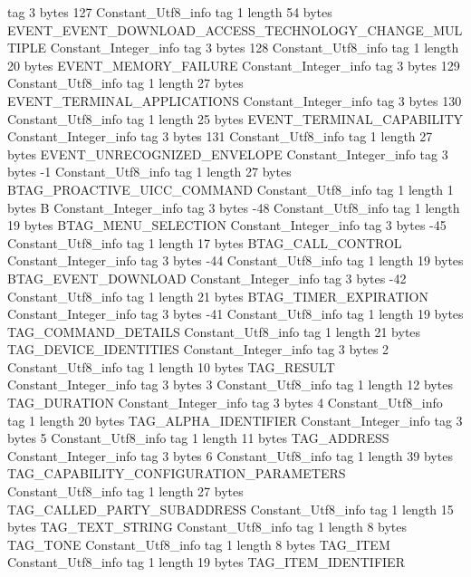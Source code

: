 {{{			tag	3
			bytes	127
		}
		Constant_Utf8_info {
			tag	1
			length	54
			bytes	EVENT_EVENT_DOWNLOAD_ACCESS_TECHNOLOGY_CHANGE_MULTIPLE
		}
		Constant_Integer_info {
			tag	3
			bytes	128
		}
		Constant_Utf8_info {
			tag	1
			length	20
			bytes	EVENT_MEMORY_FAILURE
		}
		Constant_Integer_info {
			tag	3
			bytes	129
		}
		Constant_Utf8_info {
			tag	1
			length	27
			bytes	EVENT_TERMINAL_APPLICATIONS
		}
		Constant_Integer_info {
			tag	3
			bytes	130
		}
		Constant_Utf8_info {
			tag	1
			length	25
			bytes	EVENT_TERMINAL_CAPABILITY
		}
		Constant_Integer_info {
			tag	3
			bytes	131
		}
		Constant_Utf8_info {
			tag	1
			length	27
			bytes	EVENT_UNRECOGNIZED_ENVELOPE
		}
		Constant_Integer_info {
			tag	3
			bytes	-1
		}
		Constant_Utf8_info {
			tag	1
			length	27
			bytes	BTAG_PROACTIVE_UICC_COMMAND
		}
		Constant_Utf8_info {
			tag	1
			length	1
			bytes	B
		}
		Constant_Integer_info {
			tag	3
			bytes	-48
		}
		Constant_Utf8_info {
			tag	1
			length	19
			bytes	BTAG_MENU_SELECTION
		}
		Constant_Integer_info {
			tag	3
			bytes	-45
		}
		Constant_Utf8_info {
			tag	1
			length	17
			bytes	BTAG_CALL_CONTROL
		}
		Constant_Integer_info {
			tag	3
			bytes	-44
		}
		Constant_Utf8_info {
			tag	1
			length	19
			bytes	BTAG_EVENT_DOWNLOAD
		}
		Constant_Integer_info {
			tag	3
			bytes	-42
		}
		Constant_Utf8_info {
			tag	1
			length	21
			bytes	BTAG_TIMER_EXPIRATION
		}
		Constant_Integer_info {
			tag	3
			bytes	-41
		}
		Constant_Utf8_info {
			tag	1
			length	19
			bytes	TAG_COMMAND_DETAILS
		}
		Constant_Utf8_info {
			tag	1
			length	21
			bytes	TAG_DEVICE_IDENTITIES
		}
		Constant_Integer_info {
			tag	3
			bytes	2
		}
		Constant_Utf8_info {
			tag	1
			length	10
			bytes	TAG_RESULT
		}
		Constant_Integer_info {
			tag	3
			bytes	3
		}
		Constant_Utf8_info {
			tag	1
			length	12
			bytes	TAG_DURATION
		}
		Constant_Integer_info {
			tag	3
			bytes	4
		}
		Constant_Utf8_info {
			tag	1
			length	20
			bytes	TAG_ALPHA_IDENTIFIER
		}
		Constant_Integer_info {
			tag	3
			bytes	5
		}
		Constant_Utf8_info {
			tag	1
			length	11
			bytes	TAG_ADDRESS
		}
		Constant_Integer_info {
			tag	3
			bytes	6
		}
		Constant_Utf8_info {
			tag	1
			length	39
			bytes	TAG_CAPABILITY_CONFIGURATION_PARAMETERS
		}
		Constant_Utf8_info {
			tag	1
			length	27
			bytes	TAG_CALLED_PARTY_SUBADDRESS
		}
		Constant_Utf8_info {
			tag	1
			length	15
			bytes	TAG_TEXT_STRING
		}
		Constant_Utf8_info {
			tag	1
			length	8
			bytes	TAG_TONE
		}
		Constant_Utf8_info {
			tag	1
			length	8
			bytes	TAG_ITEM
		}
		Constant_Utf8_info {
			tag	1
			length	19
			bytes	TAG_ITEM_IDENTIFIER
}}}

